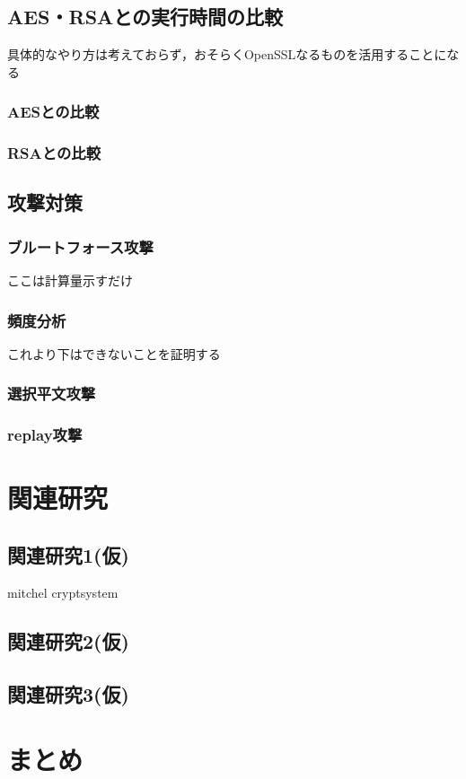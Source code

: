 \documentclass{jsarticle}
\begin{document}
\subsection{AES・RSAとの実行時間の比較}
具体的なやり方は考えておらず，おそらくOpenSSLなるものを活用することになる
\subsubsection{AESとの比較}
\subsubsection{RSAとの比較}

\subsection{攻撃対策}
\subsubsection{ブルートフォース攻撃}
ここは計算量示すだけ
\subsubsection{頻度分析}
これより下はできないことを証明する
\subsubsection{選択平文攻撃}
\subsubsection{replay攻撃}

\section{関連研究}
\subsection{関連研究1(仮)}
mitchel cryptsystem
\subsection{関連研究2(仮)}
\subsection{関連研究3(仮)}

\section{まとめ}
\end{document}
